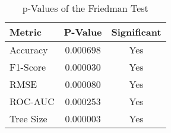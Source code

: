 
    \begin{table}[H]
        \centering
        \renewcommand{\arraystretch}{1.2}
        \caption{p-Values of the Friedman Test}
        \label{tab:final_comparison_friedman}
    \begin{tabular}{lcc}
\toprule
Metric & P-Value & Significant \\
\midrule
Accuracy & 0.000698 & Yes \\
F1-Score & 0.000030 & Yes \\
RMSE & 0.000080 & Yes \\
ROC-AUC & 0.000253 & Yes \\
Tree Size & 0.000003 & Yes \\
\bottomrule
\end{tabular}

        
    \end{table}
    